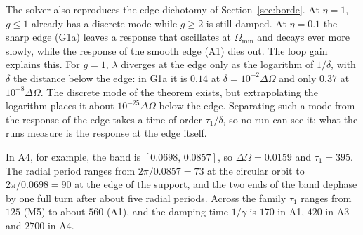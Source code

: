 \documentclass[11pt,a4paper]{article}
\begin{document}
The solver also reproduces the edge dichotomy of Section~\ref{sec:borde}. At $\eta=1$,
$g\le1$ already has a discrete mode while $g\ge2$ is still damped. At $\eta=0.1$ the sharp
edge (G1a) leaves a response that oscillates at $\Omega_{\min}$ and decays ever more slowly,
while the response of the smooth edge (A1) dies out. The loop gain explains this. For
$g=1$, $\lambda$ diverges at the edge only as the logarithm of $1/\delta$, with $\delta$ the distance
below the edge: in G1a it is $0.14$ at $\delta=10^{-2}\Delta\Omega$ and only $0.37$ at $10^{-8}\Delta\Omega$.
The discrete mode of the theorem exists, but extrapolating the logarithm places it about
$10^{-25}\Delta\Omega$ below the edge. Separating such a mode from the response of the edge
takes a time of order $\tau_1/\delta$, so no run can see it: what the runs measure is the
response at the edge itself.

In A4, for example, the band is $[0.0698,\,0.0857]$, so $\Delta\Omega=0.0159$ and
$\tau_1=395$. The radial period ranges from $2\pi/0.0857=73$ at the circular orbit to
$2\pi/0.0698=90$ at the edge of the support, and the two ends of the band dephase by one
full turn after about five radial periods. Across the family $\tau_1$ ranges from $125$
(M5) to about $560$ (A1), and the damping time $1/\gamma$ is $170$ in A1, $420$ in A3 and
$2700$ in A4.
\end{document}
